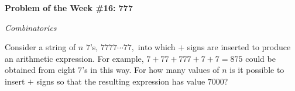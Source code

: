 \begin{potw}\vspace{5pt}
{\large\textbf{Problem of the Week \#16: 777}}\vspace{5pt}

\textit{Combinatorics}\V

Consider a string of $n$ $7$'s, $7777\cdots77,$ into which $+$ signs are inserted to produce an arithmetic expression. For example, $7+77+777+7+7=875$ could be obtained from eight $7$'s in this way. For how many values of $n$ is it possible to insert $+$ signs so that the resulting expression has value $7000$?
\end{potw}\V
